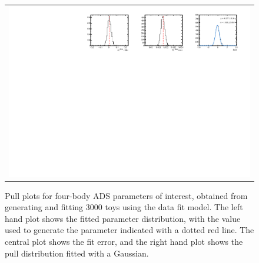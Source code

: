 \begin{figure}
\begin{tabular}{c}
\includegraphics[width=\textwidth]{ANA_resources/Plots/Data_fit/FitterBias//A_Bs_piKpipi.pdf} \\
  \end{tabular}
  \caption{Pull plots for four-body ADS parameters of interest, obtained from generating and fitting 3000 toys using the data fit model. The left hand plot shows the fitted parameter distribution, with the value used to generate the parameter indicated with a dotted red line. The central plot shows the fit error, and the right hand plot shows the pull distribution fitted with a Gaussian.}
\label{fig:fourBody_ADS_pulls}
\end{figure}
